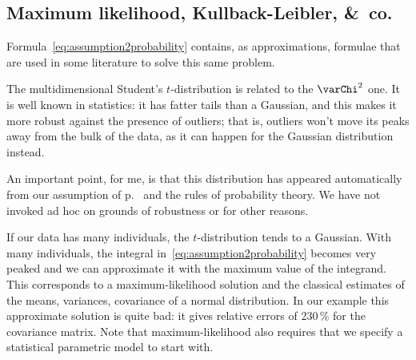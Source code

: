 \documentclass[\ifafour a4paper,12pt,\else a5paper,10pt,\fi%
onecolumn,oneside,article,%
british%
]{memoir}
\theoremstyle{remark}
\theoremstyle{innote}
\newcommand*{\amp}{\&}
\newcommand*{\pf}{\mathrm{p}}%
\renewcommand*{\|}{\mathpunct{|}}
\newcommand*{\yH}{h}
\newcommand*{\yx}{x}
\newcommand*{\yxx}{\bm{\yx}}
\newcommand*{\data}{\text{data}}
\theoremstyle{plain}
\begin{document}



\subsection{Maximum likelihood, Kullback-Leibler, \amp\ co.}
\label{sec:max_likelihood}

Formula~\eqref{eq:assumption2probability} contains, as approximations,
formulae that are used in some literature to solve this same problem.

The multidimensional Student's $t$-distribution is related to the
$\varChi^2$ one. It is well known in statistics: it has fatter tails than
a Gaussian, and this makes it more robust against the presence of outliers;
that is, outliers won't move its peaks away from the bulk of the data, as
it can happen for the Gaussian distribution instead.

An important point, for me, is that this distribution has appeared
automatically from our assumption of p.~\pageref{eq:assumption} and the
rules of probability theory. We have not invoked ad hoc on grounds of
robustness or for other reasons.

If our data has many individuals, the $t$-distribution tends to a Gaussian.
With many individuals, the integral in~\eqref{eq:assumption2probability}
becomes very peaked and we can approximate it with the maximum value of the
integrand. This corresponds to a maximum-likelihood solution and the
classical estimates of the means, variances, covariance of a normal
distribution. In our example this approximate solution is quite bad: it
gives relative errors of 230\,\% for the covariance matrix. Note that
maximum-likelihood also requires that we specify a statistical parametric
model to start with.
\end{document}
